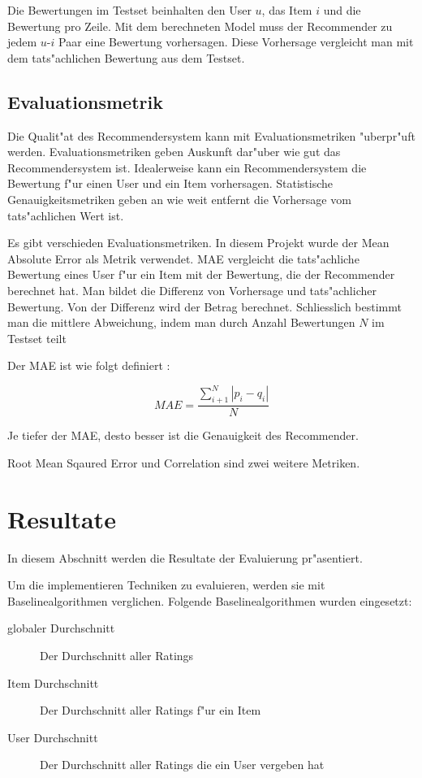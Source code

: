 \documentclass[a4paper, 11pt]{article}
\begin{document}
Die Bewertungen im Testset beinhalten den User $u$, das Item $i$ und die Bewertung pro Zeile. Mit dem berechneten Model muss der Recommender zu jedem $u$-$i$ Paar eine Bewertung vorhersagen. Diese Vorhersage vergleicht man mit dem tats"achlichen Bewertung aus dem Testset.

\subsection{Evaluationsmetrik}
\label{sec:evaluationmetrik}

Die Qualit"at des Recommendersystem kann mit Evaluationsmetriken "uberpr"uft werden. Evaluationsmetriken geben Auskunft dar"uber wie gut das Recommendersystem ist. Idealerweise kann ein Recommendersystem die Bewertung f"ur einen User und ein Item vorhersagen. Statistische Genauigkeitsmetriken geben an wie weit entfernt die Vorhersage vom tats"achlichen Wert ist. 

Es gibt verschieden Evaluationsmetriken. In diesem Projekt wurde der Mean Absolute Error als Metrik verwendet. MAE vergleicht die tats"achliche Bewertung eines User f"ur ein Item mit der Bewertung, die der Recommender berechnet hat. Man bildet die Differenz von Vorhersage und tats"achlicher Bewertung. Von der Differenz wird der Betrag berechnet. Schliesslich bestimmt man die mittlere Abweichung, indem man durch Anzahl Bewertungen $N$ im Testset teilt 

Der MAE ist wie folgt definiert \cite{sarwar01}:

\begin{equation}
  \label{eq:mae}
  MAE = \frac{\sum_{i+1}^N | p_i-q_i | }{N}
\end{equation}

Je tiefer der MAE, desto besser ist die Genauigkeit des Recommender.

Root Mean Sqaured Error und Correlation sind zwei weitere Metriken.

\section{Resultate}
\label{sec:results}

In diesem Abschnitt werden die Resultate der Evaluierung pr"asentiert.

Um die implementieren Techniken zu evaluieren, werden sie mit Baselinealgorithmen verglichen. 
Folgende Baselinealgorithmen wurden eingesetzt:

\begin{description}
\item[globaler Durchschnitt] Der Durchschnitt aller Ratings
\item[Item Durchschnitt] Der Durchschnitt aller Ratings f"ur ein Item
\item[User Durchschnitt] Der Durchschnitt aller Ratings die ein User vergeben hat
\end{description}
\end{document}
